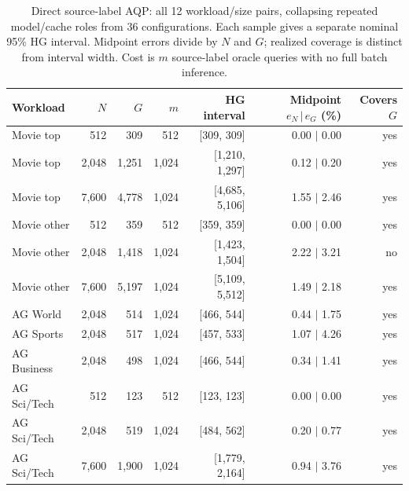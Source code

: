 \begin{table}[t]
\centering\small
\caption{Direct source-label AQP: all 12 workload/size pairs, collapsing repeated model/cache roles from 36 configurations. Each sample gives a separate nominal 95\% HG interval. Midpoint errors divide by $N$ and $G$; realized coverage is distinct from interval width. Cost is $m$ source-label oracle queries with no full batch inference.}
\label{tab:aqp_results}
\begin{tabular}{lrrrrrr}
\toprule
Workload & $N$ & $G$ & $m$ & HG interval & Midpoint $e_N\,|\,e_G$ (\%) & Covers $G$ \\
\midrule
Movie top & 512 & 309 & 512 & [309, 309] & 0.00 $\mid$ 0.00 & yes \\
Movie top & 2,048 & 1,251 & 1,024 & [1,210, 1,297] & 0.12 $\mid$ 0.20 & yes \\
Movie top & 7,600 & 4,778 & 1,024 & [4,685, 5,106] & 1.55 $\mid$ 2.46 & yes \\
Movie other & 512 & 359 & 512 & [359, 359] & 0.00 $\mid$ 0.00 & yes \\
Movie other & 2,048 & 1,418 & 1,024 & [1,423, 1,504] & 2.22 $\mid$ 3.21 & no \\
Movie other & 7,600 & 5,197 & 1,024 & [5,109, 5,512] & 1.49 $\mid$ 2.18 & yes \\
AG World & 2,048 & 514 & 1,024 & [466, 544] & 0.44 $\mid$ 1.75 & yes \\
AG Sports & 2,048 & 517 & 1,024 & [457, 533] & 1.07 $\mid$ 4.26 & yes \\
AG Business & 2,048 & 498 & 1,024 & [466, 544] & 0.34 $\mid$ 1.41 & yes \\
AG Sci/Tech & 512 & 123 & 512 & [123, 123] & 0.00 $\mid$ 0.00 & yes \\
AG Sci/Tech & 2,048 & 519 & 1,024 & [484, 562] & 0.20 $\mid$ 0.77 & yes \\
AG Sci/Tech & 7,600 & 1,900 & 1,024 & [1,779, 2,164] & 0.94 $\mid$ 3.76 & yes \\
\bottomrule
\end{tabular}
\end{table}
